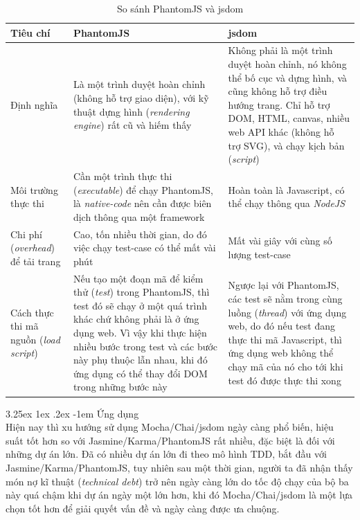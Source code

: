 \documentclass[12pt,a4paper,twoside]{article}
\makeatletter
\newcommand{\myparagraph}[1]{\paragraph{#1}\mbox{}\\} %
\renewcommand\paragraph{\@startsection{paragraph}{5}{\z@}%
  {3.25ex \@plus1ex \@minus.2ex}%
  {-1em}%
  {\normalfont\normalsize\bfseries}}
\makeatother
\begin{document}
\begin{table}
\begin{tabu} to 1\textwidth { | X[l] | X[l] | X[l] | }
\hline
\textbf{Tiêu chí} & \textbf{PhantomJS} & \textbf{jsdom}\\
\hline\hline
Định nghĩa & Là một trình duyệt hoàn chỉnh (không hỗ trợ giao diện), với kỹ thuật dựng hình (\textit{rendering engine}) rất cũ và hiếm thấy & Không phải là một trình duyệt hoàn chỉnh, nó không thể bố cục và dựng hình, và cũng không hỗ trợ điều hướng trang. Chỉ hỗ trợ DOM, HTML, canvas, nhiều web API khác (không hỗ trợ SVG), và chạy kịch bản (\textit{script})\\
\hline
Môi trường thực thi & Cần một trình thực thi (\textit{executable}) để chạy PhantomJS, là \textit{native-code} nên cần được biên dịch thông qua một framework & Hoàn toàn là Javascript, có thể chạy thông qua \textit{NodeJS} \\
\hline
Chi phí (\textit{overhead}) để tải trang & Cao, tốn nhiều thời gian, do đó việc chạy test-case có thể mất vài phút & Mất vài giây với cùng số lượng test-case \\
\hline
Cách thực thi mã nguồn (\textit{load script}) & Nếu tạo một đoạn mã  để kiểm thử (\textit{test}) trong PhantomJS, thì test đó sẽ chạy ở một quá trình khác chứ không phải là ở ứng dụng web. Vì vậy khi thực hiện nhiều bước trong test và các bước này phụ thuộc lẫn nhau, khi đó ứng dụng có thể thay đổi DOM trong những bước này & Ngược lại với PhantomJS, các test sẽ nằm trong cùng luồng (\textit{thread}) với ứng dụng web, do đó nếu test đang thực thi mã Javascript, thì ứng dụng web không thể chạy mã của nó cho tới khi test đó được thực thi xong\\
\hline
\end{tabu}
\caption{So sánh PhantomJS và jsdom}
\label{table:phantomjs_jsdom}
\end{table}

\myparagraph{Ứng dụng}
Hiện nay thì xu hướng sử dụng Mocha/Chai/jsdom ngày càng phổ biến, hiệu suất tốt hơn so với Jasmine/Karma/PhantomJS rất nhiều, đặc biệt là đối với những dự án lớn. Đã có nhiều dự án lớn đi theo mô hình TDD, bắt đầu với Jasmine/Karma/PhantomJS, tuy nhiên sau một thời gian, người ta đã nhận thấy món nợ kĩ thuật (\textit{technical debt}) trở nên ngày càng lớn do tốc độ chạy của bộ ba này quá chậm khi dự án ngày một lớn hơn, khi đó Mocha/Chai/jsdom là một lựa chọn tốt hơn để giải quyết vấn đề và ngày càng được ưa chuộng.
\end{document}

